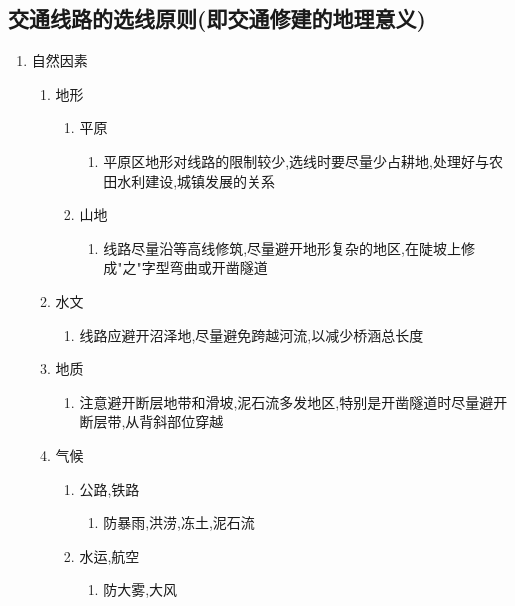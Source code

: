 \documentclass[a4paper]{article}
\begin{document}
    \subsection{交通线路的选线原则(即交通修建的地理意义)}
    \begin{enumerate}
        \item 自然因素
        \begin{enumerate}
            \item 地形
            \begin{enumerate}
                \item 平原
                \begin{enumerate}
                    \item 平原区地形对线路的限制较少,选线时要尽量少占耕地,处理好与农田水利建设,城镇发展的关系
                \end{enumerate}
                \item 山地
                \begin{enumerate}
                    \item 线路尽量沿等高线修筑,尽量避开地形复杂的地区,在陡坡上修成"之"字型弯曲或开凿隧道
                \end{enumerate}
            \end{enumerate}
            \item 水文
            \begin{enumerate}
                \item 线路应避开沼泽地,尽量避免跨越河流,以减少桥涵总长度
            \end{enumerate}
            \item 地质
            \begin{enumerate}
                \item 注意避开断层地带和滑坡,泥石流多发地区,特别是开凿隧道时尽量避开断层带,从背斜部位穿越
            \end{enumerate}
            \item 气候
            \begin{enumerate}
                \item 公路,铁路
                \begin{enumerate}
                    \item 防暴雨,洪涝,冻土,泥石流
                \end{enumerate}
                \item 水运,航空
                \begin{enumerate}
                    \item 防大雾,大风

\end{enumerate}
\end{enumerate}
\end{enumerate}
\end{enumerate}
\end{document}
